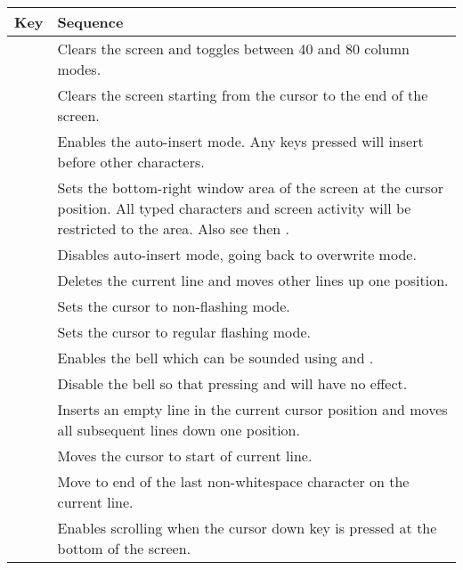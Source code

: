 \begin{center}
\begin{longtable}{C{2cm}|L{5.5cm}}
	\textbf{Key} & \textbf{Sequence}\\
   \hline
	\endhead

 &
Clears the screen and toggles between 40 and 80 column modes.\\

 &
Clears the screen starting from the cursor to the end of the screen.\\

 &
Enables the auto-insert mode. Any keys pressed will insert before other characters.\\

 &
Sets the bottom-right window area of the screen at the cursor position. All typed characters and screen activity will be restricted to the area. Also see  then .\\

 &
Disables auto-insert mode, going back to overwrite mode.\\

 &
Deletes the current line and moves other lines up one position.\\

 &
Sets the cursor to non-flashing mode.\\

 &
Sets the cursor to regular flashing mode.\\

 &
Enables the bell which can be sounded using  and .\\

 &
Disable the bell so that pressing  and  will have no effect.\\

 &
Inserts an empty line in the current cursor position and moves all subsequent lines down one position.\\

 &
Moves the cursor to start of current line.\\

 &
Move to end of the last non-whitespace character on the current line.\\

 &
Enables scrolling when the cursor down key is pressed at the bottom of the screen.\\


\end{longtable}
\end{center}

